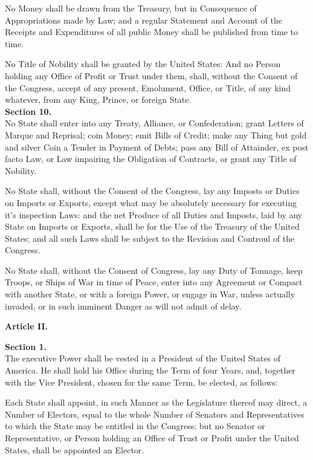 No Money shall be drawn from the Treasury, but in Consequence of Appropriations made by Law; and a regular Statement and Account of the Receipts and Expenditures of all public Money shall be published from time to time.

No Title of Nobility shall be granted by the United States: And no Person holding any Office of Profit or Trust under them, shall, without the Consent of the Congress, accept of any present, Emolument, Office, or Title, of any kind whatever, from any King, Prince, or foreign State.\\[0.01in]

{\large \textbf{Section 10.}}\\[0.01in]

No State shall enter into any Treaty, Alliance, or Confederation; grant Letters of Marque and Reprisal; coin Money; emit Bills of Credit; make any Thing but gold and silver Coin a Tender in Payment of Debts; pass any Bill of Attainder, ex post facto Law, or Law impairing the Obligation of Contracts, or grant any Title of Nobility.

No State shall, without the Consent of the Congress, lay any Imposts or Duties on Imports or Exports, except what may be absolutely necessary for executing it's inspection Laws: and the net Produce of all Duties and Imposts, laid by any State on Imports or Exports, shall be for the Use of the Treasury of the United States; and all such Laws shall be subject to the Revision and Controul of the Congress.

No State shall, without the Consent of Congress, lay any Duty of Tonnage, keep Troops, or Ships of War in time of Peace, enter into any Agreement or Compact with another State, or with a foreign Power, or engage in War, unless actually invaded, or in such imminent Danger as will not admit of delay.\\[0.01in]

\begin{center}
{\Large \textbf{Article II.}}
\end{center}

{\large \textbf{Section 1.}}\\[0.01in]

The executive Power shall be vested in a President of the United States of America. He shall hold his Office during the Term of four Years, and, together with the Vice President, chosen for the same Term, be elected, as follows:

Each State shall appoint, in such Manner as the Legislature thereof may direct, a Number of Electors, equal to the whole Number of Senators and Representatives to which the State may be entitled in the Congress: but no Senator or Representative, or Person holding an Office of Trust or Profit under the United States, shall be appointed an Elector.

